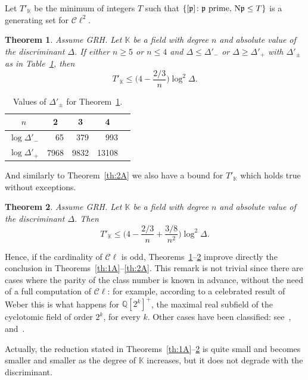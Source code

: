\documentclass[a4paper,11pt]{amsart}
\newcommand{\field}[1]{\mathbb{{#1}}}
\newcommand{\ideal}[1]{\mathfrak{{#1}}}
\newcommand{\Q}{\field{{Q}}}
\newcommand{\K}{\field{{K}}}
\newcommand{\p}{\ideal{p}}
\newcommand{\Norm}{\textrm{\upshape N}}
\newcommand{\Cl}{\mathcal C\!\ell}
\newtheorem{theorem}{Theorem}
\theoremstyle{remark}
\begin{document}
Let $T'_\K$ be the minimum of integers $T$ such that $\{[\p]\colon \p\text{ prime, } \Norm\p \leq T\}$ is
a generating set for $\Cl^2$.
%
\begin{theorem}\label{th:3A}
Assume GRH. Let $\K$ be a field with degree $n$ and absolute value of the discriminant $\Delta$. If
either $n\geq 5$ or $n\leq 4$ and $\Delta\leq\Delta'_{-}$ or $\Delta\geq\Delta'_{+}$ with
$\Delta'_{\pm}$ as in Table~\ref{tab:2A}, then
\begin{equation}\label{eq:2A}
T'_\K \leq \Big(4-\frac{2/3}{n}\Big) \log^2\Delta.
\end{equation}
\end{theorem}
%
\begin{table}[h]
\def\z{\phantom{0}}
\def\m#1{\multicolumn{1}{c}{#1}}
\begin{tabular}{crrrr}
 $n$               & \m{2} & \m{3} & \m{4} \\
  \hline
 $\log\Delta'_{-}$ &    65 &   379 &   993 \\
 $\log\Delta'_{+}$ &  7968 &  9832 & 13108
\end{tabular}
\vspace{0.2cm}
\caption{Values of $\Delta'_{\pm}$ for Theorem~\ref{th:3A}.}\label{tab:2A}
\end{table}
%
\noindent %
And similarly to Theorem~\eqref{th:2A} we also have a bound for $T'_\K$ which holds true without exceptions.
%
\begin{theorem}\label{th:4A}
Assume GRH. Let $\K$ be a field with degree $n$ and absolute value of the discriminant $\Delta$. Then
\[
T'_\K \leq \Big(4 - \frac{2/3}{n} + \frac{3/8}{n^2}\Big) \log^2\Delta.
\]
\end{theorem}
%
Hence, if the cardinality of $\Cl$ is odd, Theorems~\ref{th:3A}--\ref{th:4A} improve directly the
conclusion in Theorems~\ref{th:1A}--\ref{th:2A}. This remark is not trivial since there are cases where
the parity of the class number is known in advance, without the need of a full computation of $\Cl$: for
example, according to a celebrated result of Weber this is what happens for $\Q[2^k]^+$, the maximal real
subfield of the cyclotomic field of order $2^k$, for every $k$. Other cases have been classified:
see~\cite{Berger}, \cite{Hasse4} and~\cite{ConnerHurrelbrink}.
\medskip

Actually, the reduction stated in Theorems~\ref{th:1A}--\ref{th:4A} is quite small and becomes smaller
and smaller as the degree of $\K$ increases, but it does not degrade with the discriminant.
\end{document}
